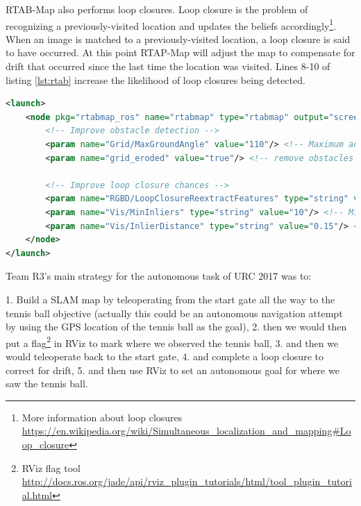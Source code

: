 \documentclass[runningheads,a4paper]{llncs}
\begin{document}
RTAB-Map also performs loop closures. Loop closure is the problem of recognizing a previously-visited location and updates the beliefs accordingly\footnote{More information about loop closures \url{https://en.wikipedia.org/wiki/Simultaneous_localization_and_mapping#Loop_closure}}. When an image is matched to a previously-visited location, a loop closure is said to have occurred. At this point RTAP-Map will adjust the map to compensate for drift that occurred since the last time the location was visited. Lines 8-10 of listing \ref{lst:rtab} increase the likelihood of loop closures being detected.  
\begin{lstlisting}[language=XML,frame=single,basicstyle=\ttfamily\footnotesize,breaklines=true,captionpos=b,caption={Important settings for tuning the RTAB-Map 3D mapping ROS package.},label={lst:rtab}]
<launch>
    <node pkg="rtabmap_ros" name="rtabmap" type="rtabmap" output="screen">
        <!-- Improve obstacle detection -->
        <param name="Grid/MaxGroundAngle" value="110"/> <!-- Maximum angle between point's normal to ground's normal to label it as ground. Points with higher angle difference are considered as obstacles. Default: 45 -->
        <param name="grid_eroded" value="true"/> <!-- remove obstacles which touch 3 or more empty cells -->

        <!-- Improve loop closure chances -->
        <param name="RGBD/LoopClosureReextractFeatures" type="string" value="true"/> <!-- Extract features even if there are some already in the nodes, more loop closures will be accepted. Default: false -->
        <param name="Vis/MinInliers" type="string" value="10"/> <!-- Minimum feature correspondences to compute/accept the transformation. Default: 20 -->
        <param name="Vis/InlierDistance" type="string" value="0.15"/> <!-- Maximum distance for feature correspondences. Used by 3D->3D estimation approach (the default approach). Default: 0.1 -->
    </node>
</launch>
\end{lstlisting}

Team R3's main strategy for the autonomous task of URC 2017 was to:

1.  Build a SLAM map by teleoperating from the start gate all the way to the tennis ball objective (actually this could be an autonomous navigation attempt by using the GPS location of the tennis ball as the goal),
2.  then we would then put a flag\footnote{RViz flag tool \url{http://docs.ros.org/jade/api/rviz_plugin_tutorials/html/tool_plugin_tutorial.html}} in RViz to mark where we observed the tennis ball,
3.  and then we would teleoperate back to the start gate,
4.  and complete a loop closure to correct for drift,
5.  and then use RViz to set an autonomous goal for where we saw the tennis ball.
\end{document}

